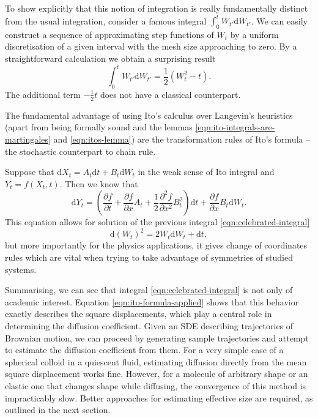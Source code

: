 \documentclass{doctoral}
\newcommand{\pd}{\partial}
\newcommand{\dd}{\mathrm{d}}
\begin{document}
To show explicitly that this notion of integration is really fundamentally distinct from the usual integration, consider a famous integral $\int_0^t W_{t'} \dd W_{t'}$.
We can easily construct a sequence of approximating step functions of $W_{t}$ by a uniform discretisation of a given interval with the mesh size approaching to zero.
By a straightforward calculation we obtain a surprising result
\begin{equation}
    \int_{0}^{t} W_{t'} \dd W_{t'} = \frac{1}{2} \left( W_t^2 - t \right).
    \label{eqn:celebrated-integral}
\end{equation}
The additional term $-\frac{1}{2}t$ does not have a classical counterpart.

The fundamental advantage of using Ito's calculus over Langevin's heuristics (apart from being formally sound and the lemmas \eqref{eqn:ito-integrals-are-martingales} and \eqref{eqn:itos-lemma}) are the transformation rules of Ito's formula -- the stochastic counterpart to chain rule.

Suppose that $\dd X_t = A_t \dd t + B_t \dd W_t$ in the weak sense of Ito integral and $Y_t = f(X_t,t)$.
Then we know that
\begin{equation}
    \dd Y_t = \left( \frac{\pd f}{\pd t} + \frac{\pd f}{\pd x} A_t + \frac{1}{2} \frac{\pd^2 f}{\pd x^2} B_t^2 \right) \dd t + \frac{\pd f}{\pd x} B_t \dd W_t.
    \label{eqn:itos-formula}
\end{equation}
This equation allows for solution of the previous integral \eqref{eqn:celebrated-integral}
\begin{equation}
    \dd (W_t)^2 = 2 W_t \dd W_t + \dd t, \label{eqn:ito-formula-applied}
\end{equation}
but more importantly for the physics applications, it gives change of coordinates rules which are vital when trying to take advantage of symmetries of studied systems.

Summarising, we can see that integral \eqref{eqn:celebrated-integral} is not only of academic interest.
Equation \eqref{eqn:ito-formula-applied} shows that this behavior exactly describes the square displacements, which play a central role in determining the diffusion coefficient.
Given an SDE describing trajectories of Brownian motion, we can proceed by generating sample trajectories and attempt to estimate the diffusion coefficient from them.
For a very simple case of a spherical colloid in a quiescent fluid, estimating diffusion directly from the mean square displacement works fine.
However, for a molecule of arbitrary shape or an elastic one that changes shape while diffusing, the convergence of this method is impracticably slow.
Better approaches for estimating effective size are required, as outlined in the next section.
\end{document}
